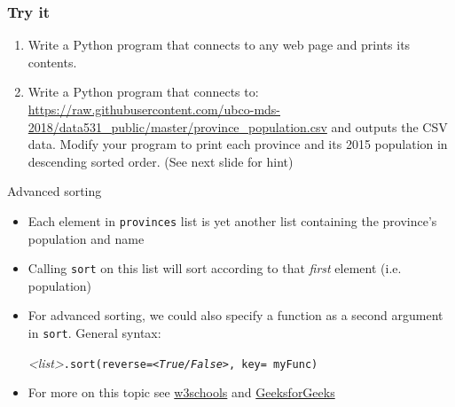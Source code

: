 \documentclass[xcolor=svgnames]{beamer}
\newcommand{\ft}[1]{\frametitle{#1}}
\begin{document}
\begin{frame}\ft{Try it}
\begin{example}
\begin{enumerate}
\item  Write a Python program that connects to any web page and prints its contents.
\item Write a Python program that connects to: 
\url{https://raw.githubusercontent.com/ubco-mds-2018/data531_public/master/province_population.csv}
and outputs the CSV data.
Modify your program to print each province and its 2015 population in descending sorted order. (See next slide for hint)
\end{enumerate}
\end{example}
\end{frame}

\begin{frame}{Advanced sorting}
\begin{itemize}
\item Each element in {\tt provinces} list is yet another list containing the province's population and name
\vfill
\item  Calling {\tt sort} on this list will sort according to that \textit{first} element (i.e. population)
\vfill
\item For advanced sorting, we could also specify a function as a second argument in {\tt sort}.  General syntax:
\begin{center}
\textit{<list>}{\tt .sort(reverse=\textit{<True/False>}, key= myFunc)}
\end{center}
\vfill
\item For more on this topic see \href{https://www.w3schools.com/python/ref\_list\_sort.asp}{w3schools} and \href{https://www.geeksforgeeks.org/python-list-sort/}{GeeksforGeeks}
\end{itemize}

\end{frame}
\end{document}
